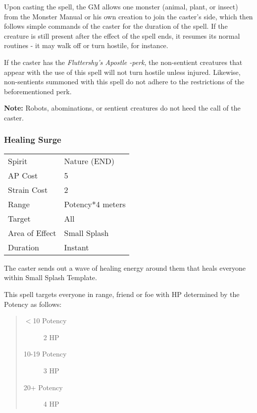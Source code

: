 \documentclass[11pt,a4paper,twocolumn]{book}
\begin{document}
Upon casting the spell, the GM allows one monster (animal, plant, or insect) from the Monster Manual or his own creation to join the caster's side, which then follows simple commands of the caster for the duration of the spell. If the creature is still present after the effect of the spell ends, it resumes its normal routines - it may walk off or turn hostile, for instance.  

If the caster has the \textit{Fluttershy's Apostle -perk}, the non-sentient creatures that appear with the use of this spell will not turn hostile unless injured. Likewise, non-sentients summoned with this spell do not adhere to the restrictions of the beforementioned perk.

\textbf{Note:} Robots, abominations, or sentient creatures do not heed the call of the caster.

\subsubsection*{Healing Surge}
{
	\begin{tabu} to 70mm{| X[l,4] | X[l,7] |}
		\hline
		Spirit         & Nature (END)          \\
		AP Cost        & 5                     \\
		Strain Cost    & 2                     \\
		Range          & Potency*4 meters \\
		Target         & All                   \\
		Area of Effect & Small Splash          \\
		Duration       & Instant               \\ \hline
	\end{tabu}
	
}
\smallskip

The caster sends out a wave of healing energy around them that heals everyone within Small Splash Template. 

This spell targets everyone in range, friend or foe with HP determined by the Potency as follows:
\begin{quote}
	\begin{description}
		\item[$<$10 Potency] 	2 HP
		\item[10-19 Potency] 	3 HP
		\item[20+ Potency]  	4 HP
	\end{description}	
\end{quote}
\end{document}
